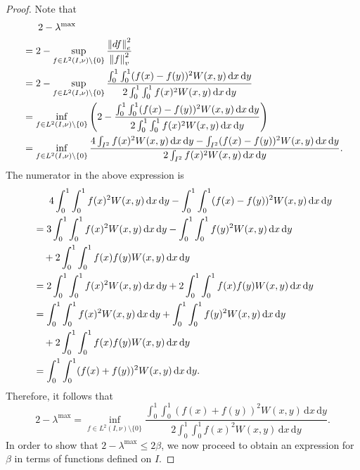 \documentclass[12pt,a4paper,bold]{thesis}
\theoremstyle{definition}
\newcommand*{\norm}[2][]{\left\Vert #2 \right\Vert_{#1}}
\begin{document}
\begin{proof}
    Note that
    \begin{align*}
        & \hspace{0.55cm} 2 - \lambda^{\max} 
        \\
        & = 
        2 - \sup_{f \in L^2(I, \nu) \setminus \{0\}} \frac{\norm[e]{df}^2}{\norm[v]{f}^2}
        \\
        & =
        2 - \sup_{f \in L^2(I, \nu) \setminus \{0\}} 
        \frac{\int_0^1 \int_0^1 (f(x) - f(y))^2 W(x,y)\, \mathrm{d}x\, \mathrm{d}y}
        {2 \int_0^1 \int_0^1 f(x)^2 W(x,y)\, \mathrm{d}x\, \mathrm{d}y}
        \\
        & =
        \inf_{f \in L^2(I, \nu) \setminus \{0\}} 
        \left(2 - \frac{\int_0^1 \int_0^1 (f(x) - f(y))^2 W(x,y)\, \mathrm{d}x\, \mathrm{d}y}
        {2 \int_0^1 \int_0^1 f(x)^2 W(x,y)\, \mathrm{d}x\, \mathrm{d}y}\right)
        \\
        & =
        \inf_{f \in L^2(I, \nu) \setminus \{0\}}
        \frac{4 \int_{I^2} f(x)^2 W(x,y)\, \mathrm{d}x\, \mathrm{d}y
        - \int_{I^2} (f(x) - f(y))^2 W(x,y)\, \mathrm{d}x\, \mathrm{d}y}
        {2 \int_{I^2} f(x)^2 W(x,y)\, \mathrm{d}x\, \mathrm{d}y}.
    \end{align*}
    The numerator in the above expression is
    \begin{align*}
        & \hspace{0.56cm}
        4 \int_0^1 \int_0^1 f(x)^2 W(x,y)\, \mathrm{d}x\, \mathrm{d}y
        - \int_0^1 \int_0^1 (f(x) - f(y))^2 W(x,y)\, \mathrm{d}x\, \mathrm{d}y
        \\
        & =
        3 \int_0^1 \int_0^1 f(x)^2 W(x,y)\, \mathrm{d}x\, \mathrm{d}y
        - \int_0^1 \int_0^1 f(y)^2 W(x,y)\, \mathrm{d}x\, \mathrm{d}y
        \\
        & \quad +
        2 \int_0^1 \int_0^1 f(x) f(y) W(x,y)\, \mathrm{d}x\, \mathrm{d}y
        \\
        & =
        2 \int_0^1 \int_0^1 f(x)^2 W(x,y)\, \mathrm{d}x\, \mathrm{d}y
        + 2 \int_0^1 \int_0^1 f(x) f(y) W(x,y)\, \mathrm{d}x\, \mathrm{d}y
        \\
        & =
        \int_0^1 \int_0^1 f(x)^2 W(x,y)\, \mathrm{d}x\, \mathrm{d}y 
        + \int_0^1 \int_0^1 f(y)^2 W(x,y)\, \mathrm{d}x\, \mathrm{d}y
        \\
        & \quad +
        2 \int_0^1 \int_0^1 f(x) f(y) W(x,y)\, \mathrm{d}x\, \mathrm{d}y
        \\
        & =
        \int_0^1 \int_0^1 (f(x) + f(y))^2 W(x,y)\, \mathrm{d}x\, \mathrm{d}y.
    \end{align*}
    Therefore, it follows that
    \begin{equation} \label{eq:2-lambdaMax}
        2 - \lambda^{\max} = \inf_{f \in L^2(I, \nu) \setminus \{0\}}
        \frac{\int_0^1 \int_0^1 (f(x) + f(y))^2 W(x,y)\, \mathrm{d}x\, \mathrm{d}y}
        {2 \int_0^1 \int_0^1 f(x)^2 W(x,y)\, \mathrm{d}x\, \mathrm{d}y}.
    \end{equation}
    In order to show that $2 - \lambda^{\max} \leq 2 \beta$, we now proceed 
    to obtain an expression for $\beta$ in terms of functions defined on $I$.
    

\end{proof}
\end{document}
